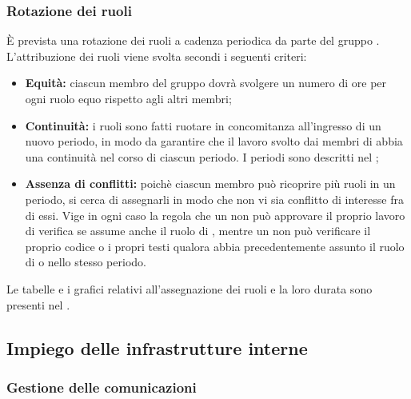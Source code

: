 \subsubsection{Rotazione dei ruoli}
È prevista una rotazione dei ruoli a cadenza periodica da parte del gruppo \groupName{}. \\
L'attribuzione dei ruoli viene svolta secondi i seguenti criteri:
\begin{itemize}
	\item \textbf{Equità: }ciascun membro del gruppo dovrà svolgere un numero di ore per ogni ruolo equo rispetto agli altri membri;
	\item \textbf{Continuità: }i ruoli sono fatti ruotare in concomitanza all'ingresso di un nuovo periodo, in modo da garantire che il lavoro svolto dai membri di \groupName{} abbia una continuità nel corso di ciascun periodo. I periodi sono descritti nel \docNameVersionPdP{};
	\item \textbf{Assenza di conflitti: }poichè ciascun membro può ricoprire più ruoli in un periodo, si cerca di assegnarli in modo che non vi sia conflitto di interesse fra di essi. Vige in ogni caso la regola che un \roleProjectManager{} non può approvare il proprio lavoro di verifica se assume anche il ruolo di \roleVerifier{}, mentre un \roleVerifier{} non può verificare il proprio codice o i propri testi qualora abbia precedentemente assunto il ruolo di \roleAnalyst{} o \roleProgrammer{} nello stesso periodo.
\end{itemize}
Le tabelle e i grafici relativi all'assegnazione dei ruoli e la loro durata sono presenti nel \docNameVersionPdP{}.

\subsection{Impiego delle infrastrutture interne}
\subsubsection{Gestione delle comunicazioni}
